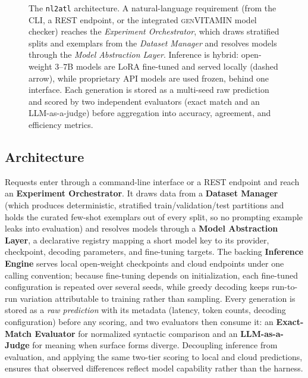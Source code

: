 \begin{figure}[t]
{%
}
\caption{The \texttt{nl2atl} architecture. A natural-language requirement (from the CLI, a REST endpoint, or the integrated \textsc{genVITAMIN} model checker) reaches the \emph{Experiment Orchestrator}, which draws stratified splits and exemplars from the \emph{Dataset Manager} and resolves models through the \emph{Model Abstraction Layer}. Inference is hybrid: open-weight $3$--$7$B models are LoRA fine-tuned and served locally (dashed arrow), while proprietary API models are used frozen, behind one interface. Each generation is stored as a multi-seed raw prediction and scored by two independent evaluators (exact match and an LLM-as-a-judge) before aggregation into accuracy, agreement, and efficiency metrics.}
\label{fig:tool_pipeline}
\end{figure}

\subsection{Architecture}
Requests enter through a command-line interface or a REST endpoint and reach an \textbf{Experiment Orchestrator}. It draws data from a \textbf{Dataset Manager} (which produces deterministic, stratified train/validation/test partitions and holds the curated few-shot exemplars out of every split, so no prompting example leaks into evaluation) and resolves models through a \textbf{Model Abstraction Layer}, a declarative registry mapping a short model key to its provider, checkpoint, decoding parameters, and fine-tuning targets. The backing \textbf{Inference Engine} serves local open-weight checkpoints and cloud endpoints under one calling convention; because fine-tuning depends on initialization, each fine-tuned configuration is repeated over several seeds, while greedy decoding keeps run-to-run variation attributable to training rather than sampling. Every generation is stored as a \emph{raw prediction} with its metadata (latency, token counts, decoding configuration) before any scoring, and two evaluators then consume it: an \textbf{Exact-Match Evaluator} for normalized syntactic comparison and an \textbf{LLM-as-a-Judge} for meaning when surface forms diverge. Decoupling inference from evaluation, and applying the same two-tier scoring to local and cloud predictions, ensures that observed differences reflect model capability rather than the harness.

